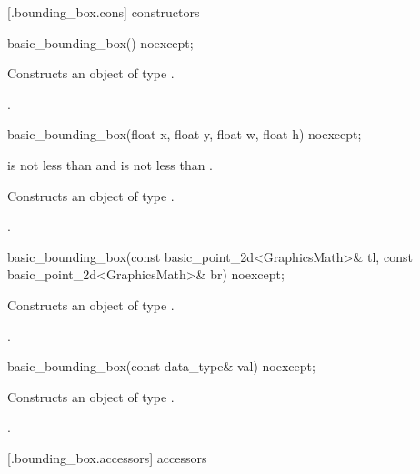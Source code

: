  [\iotwod.bounding_box.cons] { constructors}

%
\begin{itemdecl}
basic_bounding_box() noexcept;
\end{itemdecl}
\begin{itemdescr}
\pnum
\effects
Constructs an object of type .

\pnum
\postconditions
{}.
\end{itemdescr}

%
\begin{itemdecl}
basic_bounding_box(float x, float y, float w, float h) noexcept;
\end{itemdecl}
\begin{itemdescr}
\pnum
\requires
{} is not less than  and  is not less than .

\pnum
\effects
Constructs an object of type .

\pnum
\postconditions
{}.
\end{itemdescr}

%
\begin{itemdecl}
basic_bounding_box(const basic_point_2d<GraphicsMath>& tl,
  const basic_point_2d<GraphicsMath>& br) noexcept;
\end{itemdecl}
\begin{itemdescr}
\pnum
\effects
Constructs an object of type .

\pnum
\postconditions
{}.
\end{itemdescr}

%
\begin{itemdecl}
basic_bounding_box(const data_type& val) noexcept;
\end{itemdecl}
\begin{itemdescr}
\pnum
\effects
Constructs an object of type .

\pnum
\postconditions
{}.
\end{itemdescr}

 [\iotwod.bounding_box.accessors]{ accessors}

